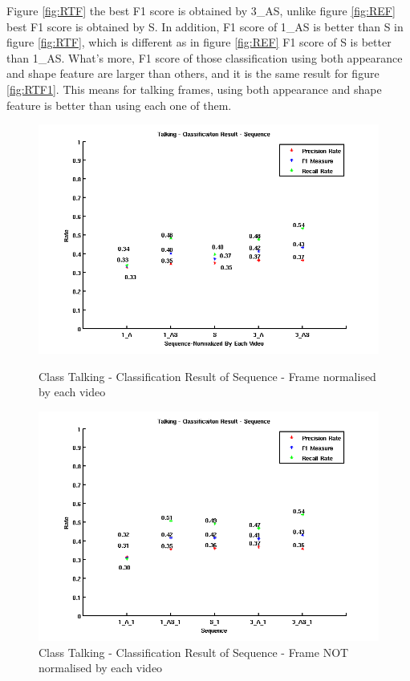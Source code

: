 \newline
Figure \ref{fig:RTF} the best F1 score is obtained by 3\_AS, unlike figure \ref{fig:REF} best F1 score is obtained by S. In addition, F1 score of 1\_AS  is better than S in figure \ref{fig:RTF}, which is different as in figure \ref{fig:REF} F1 score of S is better than 1\_AS. What's more, F1 score of those classification using both appearance and shape feature are larger than others, and it is the same result for figure \ref{fig:RTF1}. This means for talking frames, using both appearance and shape feature is better than using each one of them. 
\begin{figure}[ht]
\centering
\begin{minipage}{.5\textwidth}
  \centering
  \captionsetup{justification=centering,margin=1cm}
  \includegraphics[width=\linewidth]{imgs/Result_Talking_Sequence.png}
  \caption{Class Talking - Classification Result of Sequence - Frame normalised by each video}
  \label{fig:RTS}
\end{minipage}%
\begin{minipage}{.5\textwidth}
  \centering
  \captionsetup{justification=centering,margin=1cm}
  \includegraphics[width=\linewidth]{imgs/Result_Talking_Sequence_1.png}
  \caption{Class Talking - Classification Result of Sequence - Frame NOT normalised by each video}
  \label{fig:RTS1}
\end{minipage}
\end{figure}

